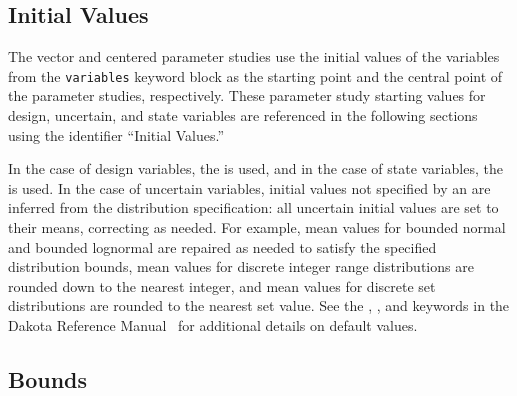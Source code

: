 \subsection{Initial Values}\label{ps:overview:initial}

The vector and centered parameter studies use the initial values of
the variables from the \texttt{variables} keyword block as the
starting point and the central point of the parameter studies,
respectively. These parameter study starting values for design,
uncertain, and state variables are referenced in the following
sections using the identifier ``Initial Values.''

In the case of design variables, the  is used,
and in the case of state variables, the  is
used. In the case of uncertain variables, initial values not specified
by an  are inferred from the distribution
specification: all uncertain initial values are set to their means,
correcting as needed.  For example, mean values for bounded normal and
bounded lognormal are repaired as needed to satisfy the specified
distribution bounds, mean values for discrete integer range
distributions are rounded down to the nearest integer, and mean values
for discrete set distributions are rounded to the nearest set
value. See the , , and
 keywords in the Dakota Reference
Manual~\cite{RefMan} for additional details on default values.

\subsection{Bounds}\label{ps:overview:bounds}

